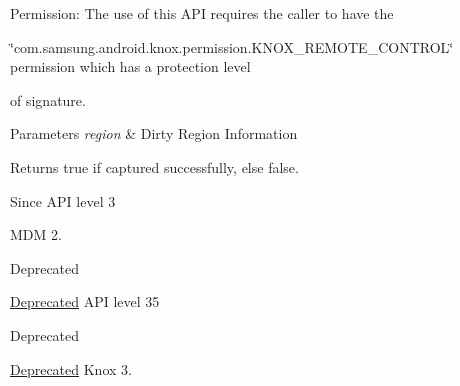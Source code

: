 \begin{DoxyPre} \end{DoxyPre}


\begin{DoxyParagraph}{\-Permission\-: }
\-The use of this \-A\-P\-I requires the caller to have the
\end{DoxyParagraph}
\char`\"{}com.\-samsung.\-android.\-knox.\-permission.\-K\-N\-O\-X\-\_\-\-R\-E\-M\-O\-T\-E\-\_\-\-C\-O\-N\-T\-R\-O\-L\char`\"{} permission which has a protection level

of signature.


\begin{DoxyParams}{\-Parameters}
{\em region} & \-Dirty \-Region \-Information\\
\hline
\end{DoxyParams}
\begin{DoxyReturn}{\-Returns}
{\ttfamily true} if captured successfully, else {\ttfamily false}.
\end{DoxyReturn}
\begin{DoxySince}{\-Since}
\-A\-P\-I level 3

\-M\-D\-M 2.
\end{DoxySince}
\begin{DoxyRefDesc}{\-Deprecated}
\item[\hyperlink{deprecated__deprecated000028}{\-Deprecated}]\-A\-P\-I level 35\end{DoxyRefDesc}


\begin{DoxyRefDesc}{\-Deprecated}
\item[\hyperlink{deprecated__deprecated000029}{\-Deprecated}]\-Knox 3.\end{DoxyRefDesc}


